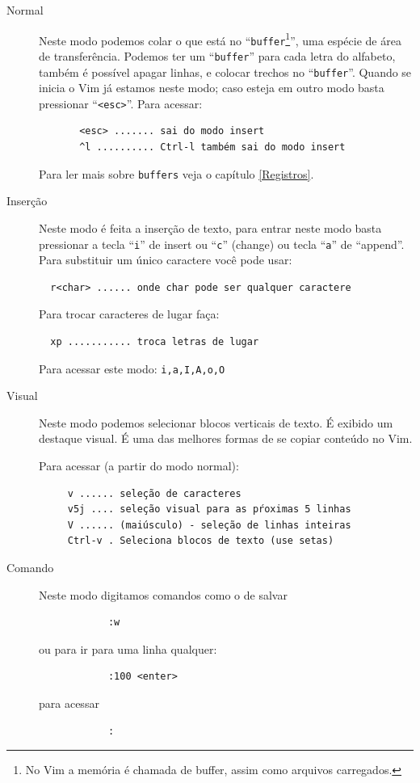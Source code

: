 \documentclass[10pt,a4paper,openany]{book}
\begin{document}
\begin{description}

\item [Normal] Neste modo podemos colar o que está no
 ``\verb|buffer|\footnote{No Vim a memória é chamada de buffer, assim como
 arquivos carregados.}'', uma espécie de área de transferência. Podemos ter um
 ``\verb|buffer|'' para cada letra do alfabeto, também é possível apagar linhas, e
 colocar trechos no ``\verb|buffer|''. Quando se inicia o Vim já estamos neste modo;
 caso esteja em outro modo basta pressionar ``\verb|<esc>|''.  Para acessar:

\begin{verbatim}
	   <esc> ....... sai do modo insert
	   ^l .......... Ctrl-l também sai do modo insert
\end{verbatim}

Para ler mais sobre \verb|buffers| veja o capítulo \ref{Registros}.

\item [Inserção]
 Neste modo é feita a inserção de texto, para entrar neste modo
 basta pressionar a tecla ``\verb|i|'' de
 insert ou ``\verb|c|'' (change) ou  tecla ``\verb|a|'' de ``append''.
 Para substituir um único caractere você pode usar:

\begin{verbatim}
  r<char> ...... onde char pode ser qualquer caractere
\end{verbatim}

Para trocar caracteres de lugar faça:

\begin{verbatim}
  xp ........... troca letras de lugar
\end{verbatim}


Para acessar este modo:  \verb+i,a,I,A,o,O+

\item [Visual] Neste modo podemos selecionar blocos verticais de texto. É
exibido um destaque visual. É uma das melhores formas de se copiar
conteúdo no Vim.

Para acessar (a partir do modo normal):

\begin{verbatim}
	 v ...... seleção de caracteres
	 v5j .... seleção visual para as pŕoximas 5 linhas
	 V ...... (maiúsculo) - seleção de linhas inteiras
	 Ctrl-v . Seleciona blocos de texto (use setas)
\end{verbatim}

\item [Comando] Neste modo digitamos comandos como o de salvar

\begin{verbatim}
			:w
\end{verbatim}

ou para ir para uma linha qualquer:

\begin{verbatim}
			:100 <enter>
\end{verbatim}

para acessar
\begin{verbatim}
			:
\end{verbatim}

\end{description}
\end{document}
